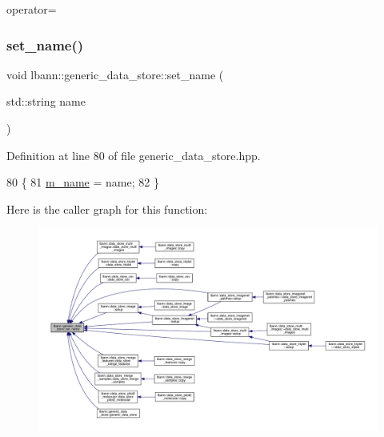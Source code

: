 operator= 

\mbox{\label{classlbann_1_1generic__data__store_a853741295a07b5687921fc56d0d7d5b2}} 
\subsubsection{\texorpdfstring{set\+\_\+name()}{set\_name()}}
{\footnotesize\ttfamily void lbann\+::generic\+\_\+data\+\_\+store\+::set\+\_\+name (\begin{DoxyParamCaption}\item[{std\+::string}]{name }\end{DoxyParamCaption})\hspace{0.3cm}{\ttfamily [inline]}}



Definition at line 80 of file generic\+\_\+data\+\_\+store.\+hpp.


\begin{DoxyCode}
80                                 \{
81     \hyperlink{classlbann_1_1generic__data__store_ad2c2e241eefc6ff972169d757f8d2499}{m\_name} = name;
82   \}
\end{DoxyCode}
Here is the caller graph for this function\+:\nopagebreak
\begin{figure}[H]
\begin{center}
\leavevmode
\includegraphics[width=350pt]{classlbann_1_1generic__data__store_a853741295a07b5687921fc56d0d7d5b2_icgraph}
\end{center}
\end{figure}
\mbox{\label{classlbann_1_1generic__data__store_a694438e0c70be757cc020ffc918fb165}} 
